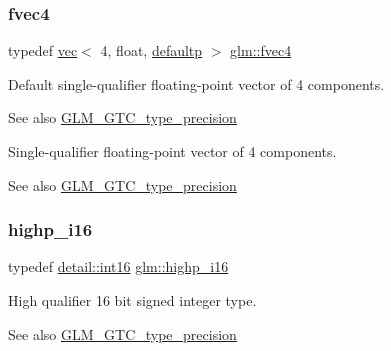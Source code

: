 \subsubsection{\texorpdfstring{fvec4}{fvec4}}
{\footnotesize\ttfamily typedef \hyperlink{structglm_1_1vec}{vec}$<$ 4, float, \hyperlink{namespaceglm_a36ed105b07c7746804d7fdc7cc90ff25a9d21ccd8b5a009ec7eb7677befc3bf51}{defaultp} $>$ \hyperlink{group__gtc__type__precision_ga0319cdd208269c180e326b243e2e84e4}{glm\+::fvec4}}

Default single-\/qualifier floating-\/point vector of 4 components. \begin{DoxySeeAlso}{See also}
\hyperlink{group__gtc__type__precision}{G\+L\+M\+\_\+\+G\+T\+C\+\_\+type\+\_\+precision}
\end{DoxySeeAlso}
Single-\/qualifier floating-\/point vector of 4 components. \begin{DoxySeeAlso}{See also}
\hyperlink{group__gtc__type__precision}{G\+L\+M\+\_\+\+G\+T\+C\+\_\+type\+\_\+precision} 
\end{DoxySeeAlso}
\mbox{\label{group__gtc__type__precision_gaa04399853952dbce29cb62e2432f350a}} 
\subsubsection{\texorpdfstring{highp\+\_\+i16}{highp\_i16}}
{\footnotesize\ttfamily typedef \hyperlink{namespaceglm_1_1detail_a375938874ca4f0a0982ec6373b56117b}{detail\+::int16} \hyperlink{group__gtc__type__precision_gaa04399853952dbce29cb62e2432f350a}{glm\+::highp\+\_\+i16}}

High qualifier 16 bit signed integer type. \begin{DoxySeeAlso}{See also}
\hyperlink{group__gtc__type__precision}{G\+L\+M\+\_\+\+G\+T\+C\+\_\+type\+\_\+precision} 
\end{DoxySeeAlso}
\mbox{\label{group__gtc__type__precision_ga197d19b585222da57d70238a5cfc2be8}} 
